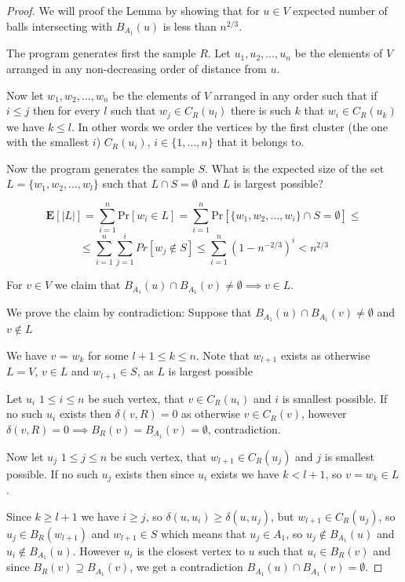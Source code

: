 \documentclass[shortabstract, lic, english]{iithesis}
\theoremstyle{definition} \newtheorem{definition}{Definition}[chapter]
\theoremstyle{remark} \newtheorem{remark}[definition]{Observation}
\theoremstyle{plain} \newtheorem{theorem}[definition]{Theorem}
\theoremstyle{plain} \newtheorem{lemma}[definition]{Lemma}
\theoremstyle{plain} \newtheorem{conjecture}[definition]{Conjecture}
\begin{document}
\begin{proof}
    We will proof the Lemma by showing that for $u \in V$ expected number of balls intersecting with $B_{A_1}(u)$ is less than $n^{2/3}$.

    The program generates first the sample $R$.
    Let $u_1, u_2, \ldots, u_n$ be the elements of $V$ arranged in any non-decreasing order of distance from $u$.

    Now let $w_1, w_2, \ldots, w_n$ be the elements of $V$ arranged in any order such that if $i \leq j$ then 
    for every $l$ such that $w_j \in C_R(u_l)$ there is such $k$ that $w_i \in C_R(u_k)$ we have $k \leq l$.
    In other words we order the vertices by the first cluster (the one with the smallest $i$) $C_R(u_i)$, $i \in \{1, \ldots, n\}$ that it belongs to.

    Now the program generates the sample $S$. What is the expected size of the set $L = \{w_1, w_2, \ldots, w_l\}$ such that $L \cap S = \emptyset$ and $L$ is largest possible?

    $$\mathbf{E}[|L|] = \sum_{i=1}^{n} \text{Pr}[w_i \in L] =\sum_{i=1}^{n} \text{Pr}[\{w_1, w_2, \ldots, w_i\} \cap S = \emptyset] \leq $$
    $$\leq \sum_{i=1}^{n} \sum_{j=1}^{i} Pr[w_j \notin S] \leq \sum_{i=1}^{n} (1 - n^{-2/3})^i < n^{2/3}$$

    For $v \in V$ we claim that $B_{A_1}(u) \cap B_{A_1}(v) \neq \emptyset \implies v \in L$.

    We prove the claim by contradiction: Suppose that $B_{A_1}(u) \cap B_{A_1}(v) \neq \emptyset$ and $v \notin L$

    We have $v$ = $w_k$ for some $l + 1 \leq k \leq n$. 
    Note that $w_{l+1}$ exists as otherwise $L = V$, $v \in L$ and $w_{l+1} \in S$, as $L$ is largest possible 
    
    Let $u_i$ $1 \leq i \leq n$ be such vertex, that $v \in C_R(u_i)$ and $i$ is smallest possible.
    If no such $u_i$ exists then $\delta(v, R) = 0$ as otherwise $v \in C_R(v)$, however $\delta(v, R) = 0 \implies B_R(v) = B_{A_1}(v) = \emptyset$, contradiction.

    Now let $u_j$ $1 \leq j \leq n$ be such vertex, that $w_{l+1} \in C_R(u_j)$ and $j$ is smallest possible. 
    If no such $u_j$ exists then since $u_i$ exists we have $k < l + 1$, so $v = w_k \in L$.

    Since $k \geq l + 1$ we have $i \geq j$, so $\delta(u, u_i) \geq \delta(u, u_j)$, but $w_{l+1} \in C_R(u_j)$, so $u_j \in B_R(w_{l+1})$ and $w_{l+1} \in S$
    which means that $u_j \in A_1$, so $u_j \notin B_{A_1}(u)$ and $u_i \notin B_{A_1}(u)$.
    However $u_i$ is the closest vertex to $u$ such that $u_i \in B_R(v)$ and since $B_R(v) \supseteq B_{A_1}(v)$, 
    we get a contradiction $B_{A_1}(u) \cap B_{A_1}(v) = \emptyset$.
\end{proof}
\end{document}
